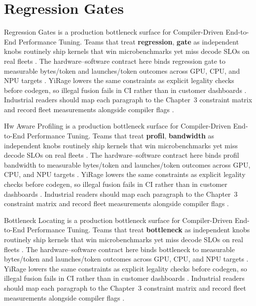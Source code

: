 \section{Regression Gates}
\label{sec:regression_gates}

Regression Gates is a production bottleneck surface for Compiler-Driven End-to-End Performance Tuning. Teams that treat \textbf{regression}, \textbf{gate} as independent knobs routinely ship kernels that win microbenchmarks yet miss decode SLOs on real fleets \citep{nvidia2022hopper,amd2024aie}. The hardware--software contract here binds regression gate to measurable bytes/token and launches/token outcomes across GPU, CPU, and NPU targets \citep{semianalysis2024tma,dlbook}. YiRage lowers the same constraints as explicit legality checks before codegen, so illegal fusion fails in CI rather than in customer dashboards \citep{amd2024xdna,dao2022flashattention}. Industrial readers should map each paragraph to the Chapter~3 constraint matrix and record fleet measurements alongside compiler flags \citep{amd2024aie,kwon2023vllm}.

Hw Aware Profiling is a production bottleneck surface for Compiler-Driven End-to-End Performance Tuning. Teams that treat \textbf{profil}, \textbf{bandwidth} as independent knobs routinely ship kernels that win microbenchmarks yet miss decode SLOs on real fleets \citep{taxbreak2026,semianalysis2024tma}. The hardware--software contract here binds profil bandwidth to measurable bytes/token and launches/token outcomes across GPU, CPU, and NPU targets \citep{memoryfloor2026,amd2024xdna}. YiRage lowers the same constraints as explicit legality checks before codegen, so illegal fusion fails in CI rather than in customer dashboards \citep{nvidia2022hopper,amd2024aie}. Industrial readers should map each paragraph to the Chapter~3 constraint matrix and record fleet measurements alongside compiler flags \citep{semianalysis2024tma,dlbook}.

Bottleneck Locating is a production bottleneck surface for Compiler-Driven End-to-End Performance Tuning. Teams that treat \textbf{bottleneck} as independent knobs routinely ship kernels that win microbenchmarks yet miss decode SLOs on real fleets \citep{memoryfloor2026,amd2024xdna}. The hardware--software contract here binds bottleneck to measurable bytes/token and launches/token outcomes across GPU, CPU, and NPU targets \citep{nvidia2022hopper,amd2024aie}. YiRage lowers the same constraints as explicit legality checks before codegen, so illegal fusion fails in CI rather than in customer dashboards \citep{semianalysis2024tma,dlbook}. Industrial readers should map each paragraph to the Chapter~3 constraint matrix and record fleet measurements alongside compiler flags \citep{amd2024xdna,dao2022flashattention}.

